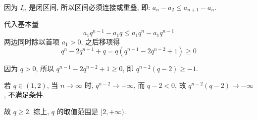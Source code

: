 \begin{solutions}
    
因为 $I_n$ 是闭区间, 所以区间必须连接或重叠, 即: $a_n - a_2 \le a_{n+1} - a_n.$

代入基本量
$$
a_1 q^{n-1} - a_1 q \le a_1 q^n - a_1 q^{n-1}
$$
两边同时除以首项 $a_1 > 0$, 之后移项得
$$
q^n-2q^{n-1} + q =  q(q^{n-1} - 2q^{n-2} + 1) \ge 0
$$

因为 $q>0$, 所以 $q^{n-1} - 2q^{n-2} + 1 \ge 0$, 即 $q^{n-2}(q - 2) \ge -1$.
    
若 $q \in (1, 2)$, 当 $n \to \infty$ 时, $q^{n-2} \to +\infty$, 而 $q-2 < 0$, 故 $q^{n-2}(q-2) \to -\infty$, 不满足条件.
    
故 $q \ge 2$. 综上, $q$ 的取值范围是 $[2, +\infty)$.
\end{solutions}